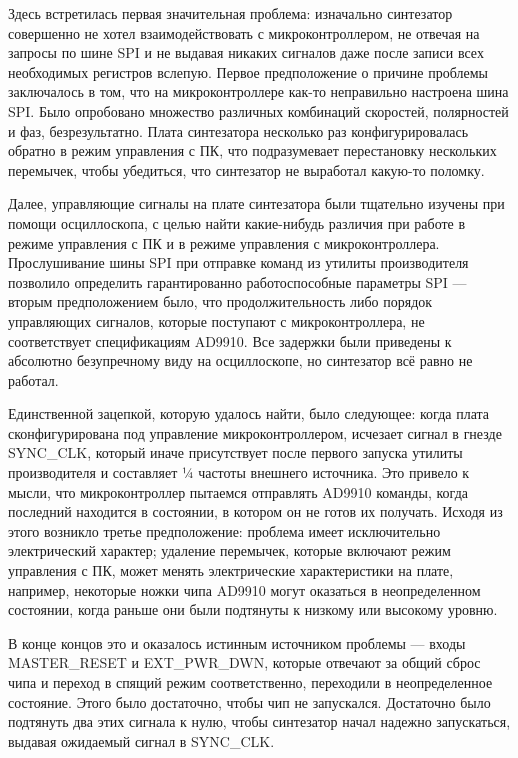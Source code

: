 \documentclass[rusmathsym, eqnumwithinsec, amspack, hyperref]{bomgost}
\begin{document}
Здесь встретилась первая значительная проблема: изначально синтезатор совершенно не хотел взаимодействовать с микроконтроллером, не отвечая на запросы по шине SPI и не выдавая никаких сигналов даже после записи всех необходимых регистров вслепую. Первое предположение о причине проблемы заключалось в том, что на микроконтроллере как-то неправильно настроена шина SPI. Было опробовано множество различных комбинаций скоростей, полярностей и фаз, безрезультатно. Плата синтезатора несколько раз конфигурировалась обратно в режим управления с ПК, что подразумевает перестановку нескольких перемычек, чтобы убедиться, что синтезатор не выработал какую-то поломку.

Далее, управляющие сигналы на плате синтезатора были тщательно изучены при помощи осциллоскопа, с целью найти какие-нибудь различия при работе в режиме управления с ПК и в режиме управления с микроконтроллера. Прослушивание шины SPI при отправке команд из утилиты производителя позволило определить гарантированно работоспособные параметры SPI --- вторым предположением было, что продолжительность либо порядок управляющих сигналов, которые поступают с микроконтроллера, не соответствует спецификациям AD9910. Все задержки были приведены к абсолютно безупречному виду на осциллоскопе, но синтезатор всё равно не работал.

Единственной зацепкой, которую удалось найти, было следующее: когда плата сконфигурирована под управление микроконтроллером, исчезает сигнал в гнезде SYNC\_CLK, который иначе присутствует после первого запуска утилиты производителя и составляет ¼ частоты внешнего источника. Это привело к мысли, что микроконтроллер пытаемся отправлять AD9910 команды, когда последний находится в состоянии, в котором он не готов их получать. Исходя из этого возникло третье предположение: проблема имеет исключительно электрический характер; удаление перемычек, которые включают режим управления с ПК, может менять электрические характеристики на плате, например, некоторые ножки чипа AD9910 могут оказаться в неопределенном состоянии, когда раньше они были подтянуты к низкому или высокому уровню.

В конце концов это и оказалось истинным источником проблемы --- входы MASTER\_RESET и EXT\_PWR\_DWN, которые отвечают за общий сброс чипа и переход в спящий режим соответственно, переходили в неопределенное состояние. Этого было достаточно, чтобы чип не запускался. Достаточно было подтянуть два этих сигнала к нулю, чтобы синтезатор начал надежно запускаться, выдавая ожидаемый сигнал в SYNC\_CLK.
\end{document}
